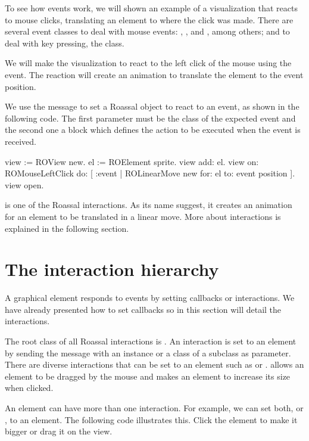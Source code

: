 \documentclass[a4paper,10pt,twoside]{book}
\begin{document}
To see how events work, we will shown an example of a visualization that reacts to mouse clicks, translating an element to where the click was made. 
There are several event classes to deal with mouse events: , ,  and , among others; and to deal with key pressing, the  class.

We will make the visualization to react to the left click of the mouse using the  event. The reaction will create an animation to translate the element to the event position.

We use the  message to set a Roassal object to react to an event, as shown in the following code. The first parameter must be the class of the expected event and the second one a block which defines the action to be executed when the event is received.

\begin{code}{}
view := ROView new.
el := ROElement sprite.
view add: el.
view 
	on: ROMouseLeftClick 
	do: [ :event | ROLinearMove new for: el to: event position ].
view open. 
\end{code}


 is one of the Roassal interactions. As its name suggest, it creates an animation for an element to be translated in a linear move. More about interactions is explained in the following section.

\section{The interaction hierarchy} 

A graphical element responds to events by setting callbacks or interactions. We have already presented how to set callbacks so in this section will detail the interactions. 

The root class of all Roassal interactions is . An interaction is set to an element by sending the  message with an instance or a class of a subclass  as parameter. There are diverse interactions that can be set to an element such as    or .
 allows an element to be dragged by the mouse and  makes an element to increase its size when clicked. 

An element can have more than one interaction. For example, we can set both,   or , to an element.
The following code illustrates this. Click the element to make it bigger or drag it on the view.
\end{document}
